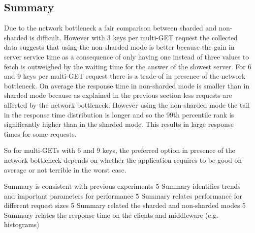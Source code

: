 \documentclass[report.tex]{subfiles}
\begin{document}
\subsection{Summary}


Due to the network bottleneck a fair comparison between sharded and non-sharded is difficult. 
However with 3 keys per multi-GET request the collected data suggests that using the non-sharded mode is better because the gain in server service time as a consequence of only having one instead of three values to fetch is outweighed by the waiting time for the answer of the slowest server. For 6 and 9 keys per multi-GET request there is a trade-of in presence of the network bottleneck. On average the response time in non-sharded mode is smaller than in sharded mode because as explained in the previous section less requests are affected by the network bottleneck. However using the non-sharded mode the tail in the response time distribution is longer and so the 99th percentile rank is significantly higher than in the sharded mode. This results in large response times for some requests.

So for multi-GETs with 6 and 9 keys, the preferred option in presence of the network bottleneck depends on whether the application requires to be good on average or not terrible in the worst case. 

Summary is consistent with previous experiments 5 Summary identifies trends and important parameters for performance 5 Summary relates performance for different request sizes 5 Summary related the sharded and non-sharded modes 5 Summary relates the response time on the clients and middleware (e.g. histograms)
\end{document}
